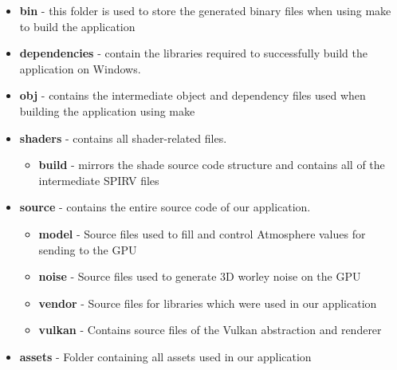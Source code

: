 \documentclass{ctuthesis}
\begin{document}
\begin{itemize}
   \item \textbf{bin} - this folder is used to store the generated binary files when using make to build the application
   \item \textbf{dependencies} - contain the libraries required to successfully build the application on Windows.
   \item \textbf{obj} - contains the intermediate object and dependency files used when building the application using make
   \item \textbf{shaders} - contains all shader-related files.
   \begin{itemize}
     \item \textbf{build} - mirrors the shade source code structure and contains all of the intermediate SPIRV files
   \end{itemize}
   \item \textbf{source} - contains the entire source code of our application.
   \begin{itemize}
        \item \textbf{model} - Source files used to fill and control Atmosphere values for sending to the GPU
        \item \textbf{noise} - Source files used to generate 3D worley noise on the GPU
        \item \textbf{vendor} - Source files for libraries which were used in our application
        \item \textbf{vulkan} - Contains source files of the Vulkan abstraction and renderer 
   \end{itemize}
   \item \textbf{assets} - Folder containing all assets used in our application
\end{itemize}
\end{document}

